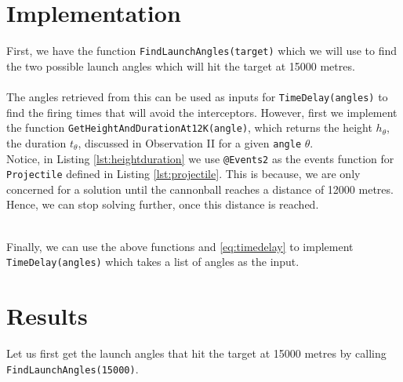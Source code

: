 \documentclass[11pt]{report}
\begin{document}
\section{Implementation}
First, we have the function \texttt{FindLaunchAngles(target)} which we will use to find the two possible launch angles which will hit the target at 15000 metres. \\


\ \\
The angles retrieved from this can be used as inputs for \texttt{TimeDelay(angles)} to find the firing times that will avoid the interceptors. However, first we implement the function \texttt{GetHeightAndDurationAt12K(angle)}, which returns the height $h_{\theta}$, the duration $t_{\theta}$, discussed in Observation II for a given \texttt{angle} $\theta$. \\



Notice, in Listing \ref{lst:heightduration} we use \texttt{@Events2} as the events function for \texttt{Projectile} defined in Listing \ref{lst:projectile}. This is because, we are only concerned for a solution until the cannonball reaches a distance of 12000 metres. Hence, we can stop solving further, once this distance is reached.


\ \\
Finally, we can use the above functions and \ref{eq:timedelay} to implement \texttt{TimeDelay(angles)} which takes a list of angles as the input. \\



\section{Results}
Let us first get the launch angles that hit the target at 15000 metres by calling \texttt{FindLaunchAngles(15000)}.
\end{document}
